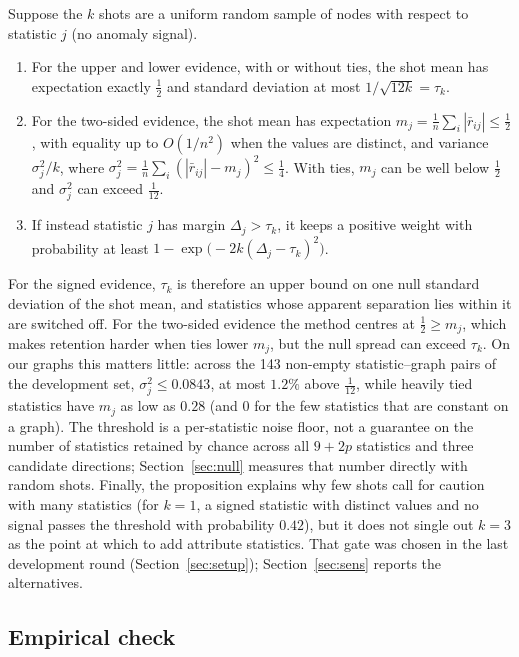 \begin{proposition}\label{prop:tau}
Suppose the $k$ shots are a uniform random sample of nodes with respect to statistic $j$ (no anomaly signal).
\begin{enumerate}
\item[(a)] For the upper and lower evidence, with or without ties, the shot mean has expectation exactly $\tfrac12$ and standard deviation at most $1/\sqrt{12k} = \tau_k$.
\item[(b)] For the two-sided evidence, the shot mean has expectation $m_j = \frac1n\sum_i |\bar r_{ij}| \le \tfrac12$, with equality up to $O(1/n^2)$ when the values are distinct, and variance $\sigma_{j}^2/k$, where $\sigma_j^2 = \frac1n\sum_i(|\bar r_{ij}| - m_j)^2 \le \tfrac14$. With ties, $m_j$ can be well below $\tfrac12$ and $\sigma_j^2$ can exceed $\tfrac1{12}$.
\item[(c)] If instead statistic $j$ has margin $\Delta_j > \tau_k$, it keeps a positive weight with probability at least $1 - \exp\!\big(-2k(\Delta_j - \tau_k)^2\big)$.
\end{enumerate}
\end{proposition}

For the signed evidence, $\tau_k$ is therefore an upper bound on one null standard deviation of the shot mean, and statistics whose apparent separation lies within it are switched off. For the two-sided evidence the method centres at $\tfrac12 \ge m_j$, which makes retention harder when ties lower $m_j$, but the null spread can exceed $\tau_k$. On our graphs this matters little: across the 143 non-empty statistic--graph pairs of the development set, $\sigma_j^2 \le 0.0843$, at most $1.2\%$ above $\tfrac1{12}$, while heavily tied statistics have $m_j$ as low as $0.28$ (and $0$ for the few statistics that are constant on a graph). The threshold is a per-statistic noise floor, not a guarantee on the number of statistics retained by chance across all $9+2p$ statistics and three candidate directions; Section~\ref{sec:null} measures that number directly with random shots. Finally, the proposition explains why few shots call for caution with many statistics (for $k=1$, a signed statistic with distinct values and no signal passes the threshold with probability $0.42$), but it does not single out $k = 3$ as the point at which to add attribute statistics. That gate was chosen in the last development round (Section~\ref{sec:setup}); Section~\ref{sec:sens} reports the alternatives.

\subsection{Empirical check}

